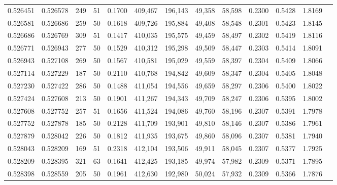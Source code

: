 \begin{tabular}{rrrrrrrrrrrrr}
0.526451 & 0.526578 &   249 &  51 &                                     0.1700 & 409,467 & 196,143 &  49,358 &  58,598 & 0.2300 & 0.5428 & 1.8169 \\
0.526581 & 0.526686 &   259 &  50 &                                     0.1618 & 409,726 & 195,884 &  49,408 &  58,548 & 0.2301 & 0.5423 & 1.8145 \\
0.526686 & 0.526769 &   309 &  51 &                                     0.1417 & 410,035 & 195,575 &  49,459 &  58,497 & 0.2302 & 0.5419 & 1.8116 \\
0.526771 & 0.526943 &   277 &  50 &                                     0.1529 & 410,312 & 195,298 &  49,509 &  58,447 & 0.2303 & 0.5414 & 1.8091 \\
0.526943 & 0.527108 &   269 &  50 &                                     0.1567 & 410,581 & 195,029 &  49,559 &  58,397 & 0.2304 & 0.5409 & 1.8066 \\
0.527114 & 0.527229 &   187 &  50 &                                     0.2110 & 410,768 & 194,842 &  49,609 &  58,347 & 0.2304 & 0.5405 & 1.8048 \\
0.527230 & 0.527422 &   286 &  50 &                                     0.1488 & 411,054 & 194,556 &  49,659 &  58,297 & 0.2306 & 0.5400 & 1.8022 \\
0.527424 & 0.527608 &   213 &  50 &                                     0.1901 & 411,267 & 194,343 &  49,709 &  58,247 & 0.2306 & 0.5395 & 1.8002 \\
0.527608 & 0.527752 &   257 &  51 &                                     0.1656 & 411,524 & 194,086 &  49,760 &  58,196 & 0.2307 & 0.5391 & 1.7978 \\
0.527752 & 0.527878 &   185 &  50 &                                     0.2128 & 411,709 & 193,901 &  49,810 &  58,146 & 0.2307 & 0.5386 & 1.7961 \\
0.527879 & 0.528042 &   226 &  50 &                                     0.1812 & 411,935 & 193,675 &  49,860 &  58,096 & 0.2307 & 0.5381 & 1.7940 \\
0.528043 & 0.528209 &   169 &  51 &                                     0.2318 & 412,104 & 193,506 &  49,911 &  58,045 & 0.2307 & 0.5377 & 1.7925 \\
0.528209 & 0.528395 &   321 &  63 &                                     0.1641 & 412,425 & 193,185 &  49,974 &  57,982 & 0.2309 & 0.5371 & 1.7895 \\
0.528398 & 0.528559 &   205 &  50 &                                     0.1961 & 412,630 & 192,980 &  50,024 &  57,932 & 0.2309 & 0.5366 & 1.7876 \\

\end{tabular}
